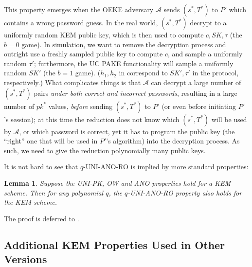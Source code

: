 \documentclass{article}
\theoremstyle{plain}
\newtheorem{lemma}{Lemma}
\theoremstyle{definition}
\theoremstyle{remark}
\newcommand{\adv}{\mathcal{A}}
\begin{document}
This property emerges when the OEKE adversary $\adv$ sends $(s^*,T^*)$ to $P'$ which contains a wrong password guess. In the real world, $(s^*,T^*)$ decrypt to a uniformly random KEM public key, which is then used to compute $c,SK,\tau$ (the $b = 0$ game). In simulation, we want to remove the decryption process and outright use a freshly sampled public key to compute $c$, and sample a uniformly random $\tau'$; furthermore, the UC PAKE functionality will sample a uniformly random $SK'$ (the $b = 1$ game). ($h_1,h_2$ in  correspond to $SK',\tau'$ in the protocol, respectively.) What complicates things is that $\adv$ can decrypt a large number of $(s^*,T^*)$ pairs \emph{under both correct and incorrect passwords}, resulting in a large number of $pk^*$ values, \emph{before} sending $(s^*,T^*)$ to $P'$ (or even before initiating $P'$'s session); at this time the reduction does not know which $(s^*,T^*)$ will be used by $\adv$, or which password is correct, yet it has to program the public key (the ``right'' one that will be used in $P'$'s algorithm) into the decryption process. As such, we need to give the reduction polynomially many public keys.

It is not hard to see that $q$-UNI-ANO-RO is implied by more standard properties:
\begin{lemma}
\label{lem:uni-ano-ro}
Suppose the UNI-PK, OW and ANO properties hold for a KEM scheme. Then for any polynomial $q$, the $q$-UNI-ANO-RO property also holds for the KEM scheme.
\end{lemma}
The proof is deferred to .

\subsection{Additional KEM Properties Used in Other Versions}
\label{sec:kem-additional}
\end{document}
